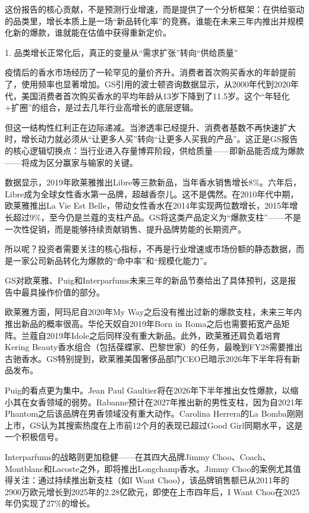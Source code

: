 \documentclass[11pt]{ctexart}
\begin{document}
这份报告的核心贡献，不是预测行业增速，而是提供了一个分析框架：在供给驱动的品类里，增长本质上是一场“新品转化率”的竞赛。谁能在未来三年内推出并规模化新的爆款，谁就能在估值中获得重新定价。

1. 品类增长正常化后，真正的变量从“需求扩张”转向“供给质量”

疫情后的香水市场经历了一轮罕见的量价齐升。消费者首次购买香水的年龄提前了，使用频率也显著增加。GS引用的波士顿咨询数据显示，从2000年代到2020年代，美国消费者首次购买香水的平均年龄从13岁下降到了11.5岁。这个“年轻化+扩圈”的组合，是过去几年行业高增长的底层逻辑。

但这一结构性红利正在边际递减。当渗透率已经提升、消费者基数不再快速扩大时，增长动力就必须从“让更多人买”转向“让更多人买我的产品”。这正是GS报告的核心逻辑切换点：当行业进入存量博弈阶段，供给质量——即新品能否成为爆款——将成为区分赢家与输家的关键。

数据显示，2019年欧莱雅推出Libre等三款新品，当年香水销售增长8\%。六年后，Libre成为全球女性香水第一品牌，超越香奈儿。这不是偶然。在2010年代中期，欧莱雅推出La Vie Est Belle，带动女性香水在2014年实现两位数增长，2015年增长超过9\%，至今仍是兰蔻的支柱产品。GS将这类产品定义为“爆款支柱”——不是一次性促销，而是能够持续贡献销售、提升品牌势能的长期资产。

所以呢？投资者需要关注的核心指标，不再是行业增速或市场份额的静态数据，而是一家公司新品转化为爆款的“命中率”和“规模化能力”。

GS对欧莱雅、Puig和Interparfums未来三年的新品节奏给出了具体预判，这是报告中最具操作价值的部分。

欧莱雅方面，阿玛尼自2020年My Way之后没有推出过新的爆款支柱，未来三年内推出新品的概率很高。华伦天奴自2019年Born in Roma之后也需要拓宽产品矩阵。兰蔻自2019年Idole之后同样没有重大新品。此外，欧莱雅还肩负着培育Kering Beauty香水组合（包括葆蝶家、巴黎世家）的任务，最晚到FY28需要推出古驰香水。GS特别提到，欧莱雅美国奢侈品部门CEO已暗示2026年下半年将有新品发布。

Puig的看点更为集中。Jean Paul Gaultier将在2026年下半年推出女性爆款，以缩小其在女香领域的弱势。Rabanne预计在2027年推出新的男性支柱，因为自2021年Phantom之后该品牌在男香领域没有重大动作。Carolina Herrera的La Bomba刚刚上市，GS认为其搜索热度在上市前12个月的表现已超过Good Girl同期水平，这是一个积极信号。

Interparfums的战略则更加稳健——在其四大品牌Jimmy Choo、Coach、Montblanc和Lacoste之外，即将推出Longchamp香水。Jimmy Choo的案例尤其值得关注：通过持续推出新支柱（如I Want Choo），该品牌销售额已从2011年的2900万欧元增长到2025年的2.28亿欧元，即使在上市四年后，I Want Choo在2025年仍实现了27\%的增长。
\end{document}
